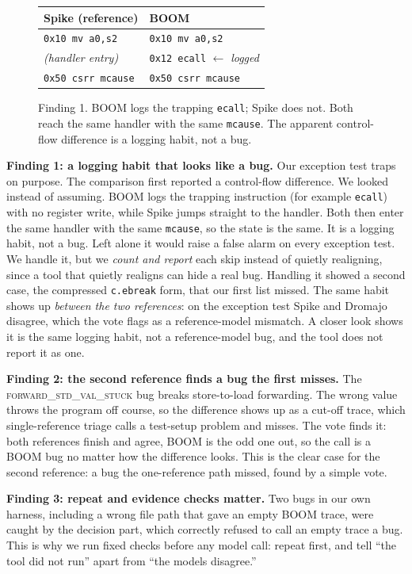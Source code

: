 \documentclass[conference]{IEEEtran}
\newcommand{\code}[1]{\texttt{\small #1}}
\newcommand{\cls}[1]{\textsc{#1}}
\begin{document}
\begin{figure}[t]
\centering\scriptsize
\begin{tabular}{@{}ll@{}}
\toprule
\textbf{Spike (reference)} & \textbf{BOOM} \\
\midrule
\code{0x10 mv a0,s2} & \code{0x10 mv a0,s2} \\
\textit{(handler entry)} & \code{0x12 ecall} $\leftarrow$ \textit{logged} \\
\code{0x50 csrr mcause} & \code{0x50 csrr mcause} \\
\bottomrule
\end{tabular}
\caption{Finding 1. BOOM logs the trapping \code{ecall}; Spike does not. Both
reach the same handler with the same \code{mcause}. The apparent control-flow
difference is a logging habit, not a bug.}
\label{fig:finding1}
\end{figure}

\textbf{Finding 1: a logging habit that looks like a bug.} Our exception test
traps on purpose. The comparison first reported a control-flow difference. We
looked instead of assuming. BOOM logs the trapping instruction (for example
\code{ecall}) with no register write, while Spike jumps straight to the handler.
Both then enter the same handler with the same \code{mcause}, so the state is
the same. It is a logging habit, not a bug. Left alone it would raise a false
alarm on every exception test. We handle it, but we \emph{count and report} each
skip instead of quietly realigning, since a tool that quietly realigns can hide
a real bug. Handling it showed a second case, the compressed \code{c.ebreak}
form, that our first list missed. The same habit shows up \emph{between the two
references}: on the exception test Spike and Dromajo disagree, which the vote
flags as a reference-model mismatch. A closer look shows it is the same logging
habit, not a reference-model bug, and the tool does not report it as one.

\textbf{Finding 2: the second reference finds a bug the first misses.} The
\cls{forward\_std\_val\_stuck} bug breaks store-to-load forwarding. The wrong
value throws the program off course, so the difference shows up as a cut-off
trace, which single-reference triage calls a test-setup problem and misses. The
vote finds it: both references finish and agree, BOOM is the odd one out, so the
call is a BOOM bug no matter how the difference looks. This is the clear case for
the second reference: a bug the one-reference path missed, found by a simple
vote.

\textbf{Finding 3: repeat and evidence checks matter.} Two bugs in our own
harness, including a wrong file path that gave an empty BOOM trace, were caught
by the decision part, which correctly refused to call an empty trace a bug. This
is why we run fixed checks before any model call: repeat first, and tell ``the
tool did not run'' apart from ``the models disagree.''
\end{document}
